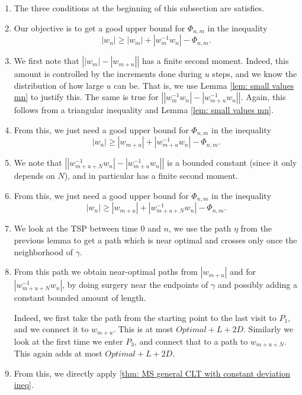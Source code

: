\begin{enumerate}
	\item The three conditions at the beginning of this subsection are satisfies.
	\item Our objective is to get a good upper bound for $\Phi_{n,m}$ in the inequality
	\[|w_n|\ge |w_m|+|w_{m}^{-1}w_n|-\Phi_{n,m}. \]
	\item We first note that $\left| |w_m|-|w_{m+u}| \right|$ has a finite second moment. Indeed, this amount is controlled by the increments done during $u$ steps, and we know the distribution of how large $u$ can be. That is, we use Lemma \ref{lem: small values mn} to justify this.  The same is true for $\left| |w_m^{-1}w_n|-|w_{m+u}^{-1}w_n| \right|$. Again, this follows from a triangular inequality and Lemma \ref{lem: small values mn}.
	\item From this, we just need a good upper bound for $\Phi_{n,m}$ in the inequality
	\[|w_n|\ge |w_{m+u}|+|w_{m+u}^{-1}w_n|-\Phi_{n,m}. \]
	\item We note that $\left||w_{m+u+N}^{-1}w_n| -|w_{m+u}^{-1}w_n|\right|$ is a bounded constant (since it only depends on $N$), and in particular has a finite second moment.
	\item From this, we just need a good upper bound for $\Phi_{n,m}$ in the inequality
	\[|w_n|\ge |w_{m+u}|+|w_{m+u+N}^{-1}w_n|-\Phi_{n,m}. \]
	\item We look at the TSP between time $0$ and $n$, we use the path $\eta$ from the previous lemma to get a path which is near optimal and crosses only once the neighborhood of $\gamma$.
	\item From this path we obtain near-optimal paths from $|w_{m+u}|$ and for $|w_{m+u+N}^{-1}w_n|$, by doing surgery near the endpoints of $\gamma$ and possibly adding a constant bounded amount of length.
	
	Indeed, we first take the path from the starting point to the last visit to $P_1$, and we connect it to $w_{m+u}$. This is at most $Optimal+L+2D$. Similarly we look at the first time we enter $P_3$, and connect that to a path to $w_{m+u+N}$. This again adds at most $Optimal+L+2D$.
	\item From this, we directly apply \ref{thm: MS general CLT with constant deviation ineq}.
\end{enumerate}
